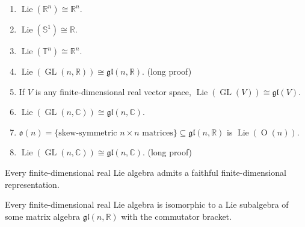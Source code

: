 \begin{example}\leavevmode
	\begin{enumerate}
		\item $\operatorname{Lie}(\mathbb{R}^n)\cong\mathbb{R}^n$.
		\item $\operatorname{Lie}(\mathbb{S}^1)\cong\mathbb{R}$.
		\item $\operatorname{Lie}(\mathbb{T}^n)\cong\mathbb{R}^n$.
		\item $\operatorname{Lie}(\operatorname{GL}(n,\mathbb{R}))\cong\mathfrak{gl}(n,\mathbb{R})$. (long proof)
		\item If $V$ is any finite-dimensional real vector space, $\operatorname{Lie}(\operatorname{GL}(V))\cong\mathfrak{gl}(V)$.
		\item $\operatorname{Lie}(\operatorname{GL}(n,\mathbb{C}))\cong\mathfrak{gl}(n,\mathbb{C})$.
		\item $\mathfrak{o}(n)=\{\text{skew-symmetric }n\times n\text{ matrices}\}\subseteq\mathfrak{gl}(n,\mathbb{R})$ is $\operatorname{Lie}(\operatorname{O}(n))$.
		\item $\operatorname{Lie}(\operatorname{GL}(n,\mathbb{C}))\cong\mathfrak{gl}(n,\mathbb{C})$. (long proof)
	\end{enumerate}
\end{example}
\begin{thm}
	Every finite-dimensional real Lie algebra admits a faithful finite-dimensional representation.
\end{thm}
\begin{coro}
	Every finite-dimensional real Lie algebra is isomorphic to a Lie subalgebra of some matrix algebra $\mathfrak{gl}(n,\mathbb{R})$ with the commutator bracket.
\end{coro}

